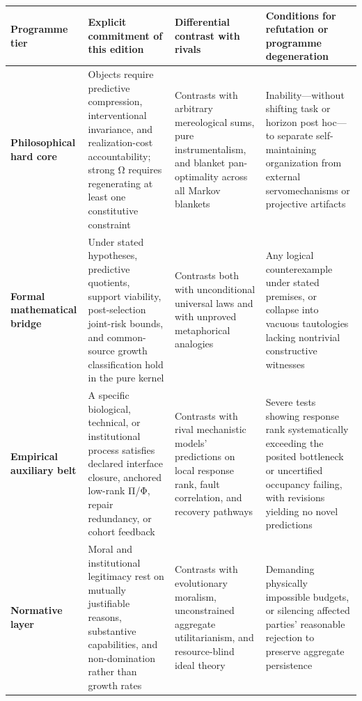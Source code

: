 \documentclass[
  english,
  11pt,
  oneside]{book}
\newcounter{none} %
\begin{document}
{\def\LTcaptype{none} %
\begin{longtable}[]{@{}
  >{\raggedright\arraybackslash}p{}
  >{\raggedright\arraybackslash}p{}
  >{\raggedright\arraybackslash}p{}
  >{\raggedright\arraybackslash}p{}@{}}
\toprule\noalign{}
\begin{minipage}[b]{\linewidth}\raggedright
Programme tier
\end{minipage} & \begin{minipage}[b]{\linewidth}\raggedright
Explicit commitment of this edition
\end{minipage} & \begin{minipage}[b]{\linewidth}\raggedright
Differential contrast with rivals
\end{minipage} & \begin{minipage}[b]{\linewidth}\raggedright
Conditions for refutation or programme degeneration
\end{minipage} \\
\midrule\noalign{}
\endhead
\bottomrule\noalign{}
\endlastfoot
\textbf{Philosophical hard core} & Objects require predictive compression, interventional invariance, and realization-cost accountability; strong Ω requires regenerating at least one constitutive constraint & Contrasts with arbitrary mereological sums, pure instrumentalism, and blanket pan-optimality across all Markov blankets & Inability---without shifting task or horizon post hoc---to separate self-maintaining organization from external servomechanisms or projective artifacts \\
\textbf{Formal mathematical bridge} & Under stated hypotheses, predictive quotients, support viability, post-selection joint-risk bounds, and common-source growth classification hold in the pure kernel & Contrasts both with unconditional universal laws and with unproved metaphorical analogies & Any logical counterexample under stated premises, or collapse into vacuous tautologies lacking nontrivial constructive witnesses \\
\textbf{Empirical auxiliary belt} & A specific biological, technical, or institutional process satisfies declared interface closure, anchored low-rank Π/Φ, repair redundancy, or cohort feedback & Contrasts with rival mechanistic models' predictions on local response rank, fault correlation, and recovery pathways & Severe tests showing response rank systematically exceeding the posited bottleneck or uncertified occupancy failing, with revisions yielding no novel predictions \\
\textbf{Normative layer} & Moral and institutional legitimacy rest on mutually justifiable reasons, substantive capabilities, and non-domination rather than growth rates & Contrasts with evolutionary moralism, unconstrained aggregate utilitarianism, and resource-blind ideal theory & Demanding physically impossible budgets, or silencing affected parties' reasonable rejection to preserve aggregate persistence \\
\end{longtable}
}
\end{document}
